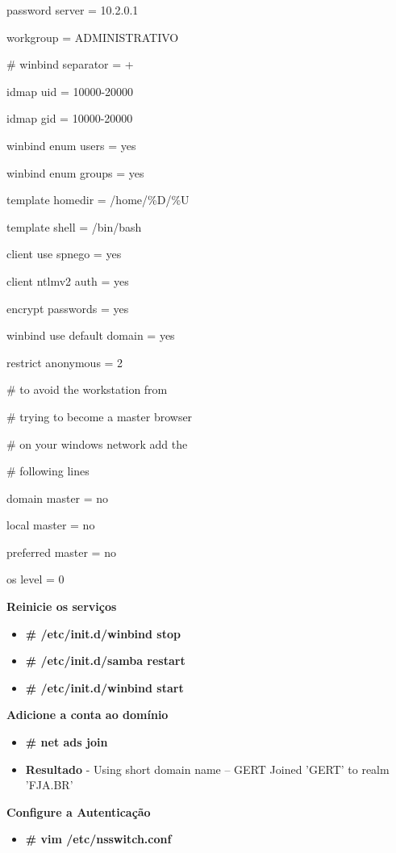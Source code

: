         password server = 10.2.0.1

        workgroup = ADMINISTRATIVO

\#       winbind separator = +

        idmap uid = 10000-20000

        idmap gid = 10000-20000

        winbind enum users = yes

        winbind enum groups = yes

        template homedir = /home/\%D/\%U

        template shell = /bin/bash

        client use spnego = yes

        client ntlmv2 auth = yes

        encrypt passwords = yes

        winbind use default domain = yes

        restrict anonymous = 2

\# to avoid the workstation from

\# trying to become a master browser

\# on your windows network add the

\# following lines

        domain master = no

        local master = no

        preferred master = no

        os level = 0

\textbf{Reinicie os serviços}

\begin{itemize}
	\item \textbf{\# /etc/init.d/winbind stop}
	\item \textbf{\# /etc/init.d/samba restart}
	\item \textbf{\# /etc/init.d/winbind start}
\end{itemize}

\textbf{Adicione a conta ao domínio}

\begin{itemize}
	\item \textbf{\# net ads join}
	\item \textbf{Resultado} - Using short domain name – GERT Joined 'GERT' to realm 'FJA.BR'
\end{itemize}

\textbf{Configure a Autenticação}

\begin{itemize}
	\item \textbf{\# vim /etc/nsswitch.conf}
\end{itemize}


